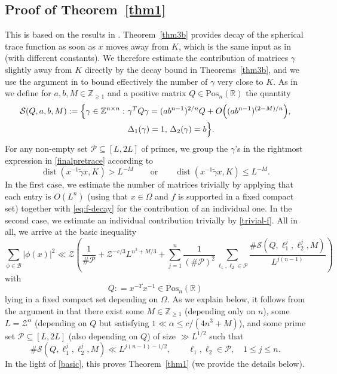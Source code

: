 \documentclass[11pt,oneside]{amsart}
\numberwithin{equation}{section}
\theoremstyle{remark}
\theoremstyle{plain}
\DeclareMathOperator{\dist}{dist}
\newcommand\ZZ{\mathbb{Z}}
\newcommand\RR{\mathbb{R}}
\newcommand{\mcB}{\mathcal{B}}
\newcommand{\mcP}{\mathcal{P}}
\newcommand{\mcS}{\mathcal{S}}
\newcommand{\mcZ}{\mathcal{Z}}
\renewcommand\leq{\leqslant}
\renewcommand\geq{\geqslant}
\begin{document}
\subsection{Proof of Theorem~\ref{thm1}}
This is based on the results in \cite{BM}. Theorem~\ref{thm3b} provides decay of the spherical trace function as soon as $x$ moves away from $K$, which is the same input as in \cite[(2.4)]{BM} (with different constants). We therefore estimate the contribution of matrices $\gamma$ slightly away from $K$ directly by the decay bound in Theorems~\ref{thm3b}, and we use the argument in \cite{BM} to bound effectively the number of $\gamma$ very close to $K$. As in \cite[(2.7)]{BM} we define for $a, b, M\in\ZZ_{\geq 1}$ and a positive matrix $Q \in \text{Pos}_n(\RR)$ the quantity
\begin{equation*} 
\begin{split}
\mcS(Q, a, b, M) := \Big\{\gamma \in \ZZ^{n\times n} : \ &\gamma^T Q \gamma = (ab^{n-1})^{2/n} Q + O\Bigl((ab^{n-1})^{(2-M)/n}\Bigr), \\
& \Delta_1(\gamma) = 1, \, \Delta_2(\gamma) = b\Big\}.
\end{split}
\end{equation*}
For any non-empty set $\mcP \subseteq [L, 2L]$ of primes, we group the $\gamma$'s in the rightmost expression in \eqref{finalpretrace} according to
\[
\dist(x^{-1}\tilde\gamma x,K) > L^{-M} \qquad \text{or} \qquad \dist(x^{-1}\tilde\gamma x,K) \leq L^{-M}.
\]
In the first case, we estimate the number of matrices trivially by applying that each entry is $O(L^n)$ (using that $x\in\Omega$ and $f$ is supported in a fixed compact set) together with \eqref{eq:f-decay} for the contribution of an individual one. In the second case, we estimate an individual contribution trivially by \eqref{trivial-f}. All in all, we arrive at the basic inequality
\begin{equation}\label{basic}
\sum_{\phi\in\mcB}|\phi(x)|^2 \ll \mcZ\left(\frac{1}{\#\mcP} + \mcZ^{-c/3} L^{n^3 +M/3} + \sum_{j=1}^n \frac{1}{(\# \mcP)^2} \sum_{\ell_1, \ell_2 \in \mcP} \frac{\#\mcS(Q, \ell_1^j, \ell_2^j, M)}{L^{j(n-1)}}\right)
\end{equation}
with
\[
Q: = x^{-T} x^{-1} \in \text{Pos}_n(\RR)
\]
lying in a fixed compact set depending on $\Omega$. As we explain below, it follows from the argument in \cite[\S5--\S7]{BM} that there exist some $M\in\ZZ_{\geq 1}$ (depending only on $n$), some $L=\mcZ^{\alpha}$ (depending on $Q$ but satisfying $1\ll \alpha\leq c/(4n^3+M)$), and some prime set $\mcP\subseteq [L,2L]$ (also depending on $Q$) of size $\gg L^{1/2}$ such that
\[
\#\mcS(Q, \ell_1^j, \ell_2^{j}, M) \ll L^{j(n-1)-1/2},\qquad \ell_1,\ell_2\in\mcP,\quad 1 \leq j\leq n.
\]
In the light of \eqref{basic}, this proves Theorem~\ref{thm1} (we provide the details below).
\end{document}
